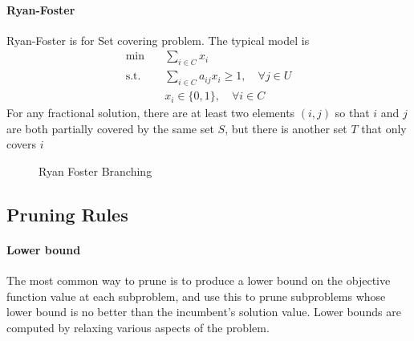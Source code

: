                 \paragraph{Ryan-Foster}
                    Ryan-Foster is for Set covering problem. The typical model is
                    \begin{align*}
                        \text{min} \quad & \sum_{i \in C} x_i \\
                        \text{s.t.} \quad & \sum_{i \in C} a_{ij}x_{i} \ge 1, \quad \forall j \in U \\
                                & x_i \in \{0, 1\}, \quad \forall i \in C 
                    \end{align*}
                    For any fractional solution, there are at least two elements $(i,j)$ so that $i$ and $j$ are both partially covered by the same set $S$, but there is another set $T$ that only covers $i$
                    
                    \begin{figure}[H]
                        \centering
                        \caption{Ryan Foster Branching}
                    \end{figure}

            \subsection{Pruning Rules}
                \paragraph{Lower bound}
                    The most common way to prune is to produce a lower bound on the objective function value at each subproblem, and use this to prune subproblems whose lower bound is no better than the incumbent’s solution value. Lower bounds are computed by relaxing various aspects of the problem.

